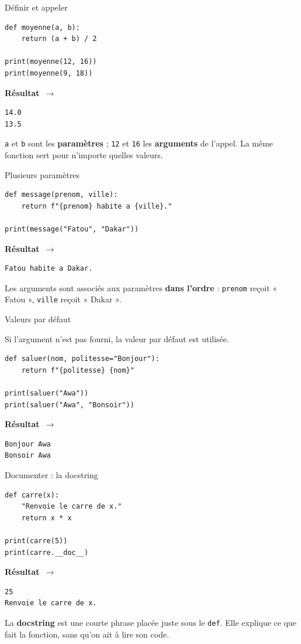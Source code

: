 \documentclass[aspectratio=169,11pt]{beamer}
\newcommand{\resultat}{{\scriptsize\textbf{R\'esultat}~$\rightarrow$}\par\vspace{1pt}}
\begin{document}
\begin{frame}[fragile]{Définir et appeler}
\begin{lstlisting}
def moyenne(a, b):
    return (a + b) / 2

print(moyenne(12, 16))
print(moyenne(9, 18))
\end{lstlisting}
\resultat
\begin{lstlisting}[style=out]
14.0
13.5
\end{lstlisting}
{\small \texttt{a} et \texttt{b} sont les \textbf{paramètres} ; \texttt{12} et \texttt{16} les \textbf{arguments} de l'appel. La même fonction sert pour n'importe quelles valeurs.}
\end{frame}

\begin{frame}[fragile]{Plusieurs paramètres}
\begin{lstlisting}
def message(prenom, ville):
    return f"{prenom} habite a {ville}."

print(message("Fatou", "Dakar"))
\end{lstlisting}
\resultat
\begin{lstlisting}[style=out]
Fatou habite a Dakar.
\end{lstlisting}
{\small Les arguments sont associés aux paramètres \textbf{dans l'ordre} : \texttt{prenom} reçoit « Fatou », \texttt{ville} reçoit « Dakar ».}
\end{frame}

\begin{frame}[fragile]{Valeurs par défaut}
\begin{ucadex}
{\small Si l'argument n'est pas fourni, la valeur par défaut est utilisée.}
\end{ucadex}
\begin{lstlisting}
def saluer(nom, politesse="Bonjour"):
    return f"{politesse} {nom}"

print(saluer("Awa"))
print(saluer("Awa", "Bonsoir"))
\end{lstlisting}
\resultat
\begin{lstlisting}[style=out]
Bonjour Awa
Bonsoir Awa
\end{lstlisting}
\end{frame}

\begin{frame}[fragile]{Documenter : la docstring}
\begin{lstlisting}
def carre(x):
    "Renvoie le carre de x."
    return x * x

print(carre(5))
print(carre.__doc__)
\end{lstlisting}
\resultat
\begin{lstlisting}[style=out]
25
Renvoie le carre de x.
\end{lstlisting}
{\small La \textbf{docstring} est une courte phrase placée juste sous le \texttt{def}. Elle explique ce que fait la fonction, sans qu'on ait à lire son code.}
\end{frame}
\end{document}
